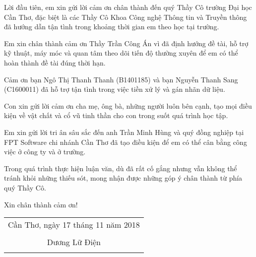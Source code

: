 \documentclass[./thesis.tex]{subfiles}
\begin{document}
Lời đầu tiên, em xin gửi lời cảm ơn chân thành đến quý Thầy Cô trường Đại học Cần Thơ, đặc biệt là các Thầy Cô Khoa Công nghệ Thông tin và Truyền thông đã hướng dẫn tận tình trong khoảng thời gian em theo học tại trường. 

Em xin chân thành cảm ơn Thầy Trần Công Án vì đã định hướng đề tài, hỗ trợ kỹ thuật, máy móc và quan tâm theo dõi tiến độ thường xuyên để em có thể hoàn thành đề tài đúng thời hạn.

Cảm ơn bạn Ngô Thị Thanh Thanh (B1401185) và bạn Nguyễn Thanh Sang (C1600011) đã hỗ trợ tận tình trong việc tiền xử lý và gán nhãn dữ liệu.

Con xin gửi lời cảm ơn cha mẹ, ông bà, những người luôn bên cạnh, tạo mọi điều kiện về vật chất và  cổ vũ tinh thần cho con trong suốt quá trình học tập.

Em xin gửi lời tri ân sâu sắc đến anh Trần Minh Hùng và quý đồng nghiệp tại FPT Software chi nhánh Cần Thơ đã tạo điều kiện để em có thể cân bằng công việc ở công ty và ở trường.

Trong quá trình thực hiện luận văn, dù đã rất cố gắng nhưng vẫn không thể tránh khỏi những thiếu sót, mong nhận được những góp ý chân thành từ phía quý Thầy Cô.

Xin chân thành cảm ơn!

\hspace*{\fill}
\begin{tabular}{@{}c@{}} 

\\Cần Thơ, ngày 17 tháng 11 năm 2018\\ \\
Dương Lữ Điện\\ \\
\end{tabular}
\end{document}
